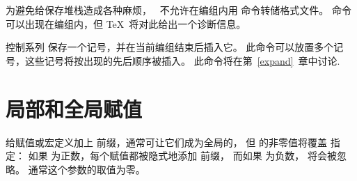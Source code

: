 \documentclass[letterpaper]{book}
\begin{document}
为避免给保存堆栈造成各种麻烦，
\IniTeX\ 不允许在编组内用  命令转储格式文件。
 命令可以出现在编组内，但 \TeX\ 将对此给出一个诊断信息。

控制系列  保存一个记号，并在当前编组结束后插入它。
此命令可以放置多个记号，这些记号将按出现的先后顺序被插入。
此命令将在第~\ref{expand}~章中讨论.


\section{局部和全局赋值}
\label{global:assign}

给赋值或宏定义加上  前缀，通常可让它们成为全局的，
但   的非零值将覆盖 指定：
如果  为正数，每个赋值都被隐式地添加  前缀，
而如果  为负数， 将会被忽略。
通常这个参数的取值为零。
\end{document}
